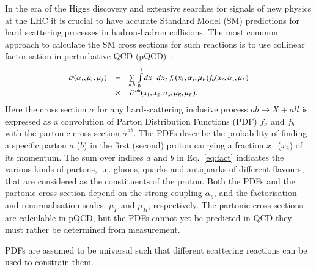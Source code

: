 In the era of the Higgs discovery and extensive searches
for signals of new physics at the LHC it is crucial
to have accurate Standard Model (SM) predictions for
hard scattering processes in hadron-hadron collisions.
The most common approach to calculate the SM cross sections for  
such reactions is to use collinear factorisation in perturbative QCD (pQCD)~\cite{Collins:1989}:
\begin{equation}
\small
\begin{array}{lcl}
\sigma(\alpha_s,\mu_r,\mu_f) & = &
\sum\limits_{a,b}\,  \int\limits_{0}\limits^{1} dx_1\ dx_2\, f_a(x_1,\alpha_s,\mu_F) 
 f_b(x_2,\alpha_s,\mu_F)\\ 
& \times & \, \hat{\sigma}^{ab}(x_1,x_2;\alpha_s,\mu_R,\mu_F).
\label{eq:fact}
\end{array}
\end{equation}
Here the cross section $\sigma$ for 
any hard-scattering inclusive process $ab \rightarrow X + all$
is expressed
as a convolution of Parton Distribution Functions (PDF) $f_a$ and $f_b$
with the partonic cross section
$\hat{\sigma}^{ab}$.
%
The PDFs describe 
the probability of finding a specific parton $a$ ($b$) in the first (second) proton carrying a fraction $x_1$ ($x_2$) of its momentum.
%
The sum over indices $a$ and $b$ in Eq.~\ref{eq:fact} indicates the various 
kinds of partons,
i.e. gluons, quarks and antiquarks of different flavours, 
that are considered
as the constituents of the proton.
%
Both the PDFs and the partonic cross section depend on the strong coupling
$\alpha_s$, and the factorisation and renormalisation scales,
$\mu_F$ and $\mu_R$, respectively.
%
The partonic cross sections are calculable in pQCD, but
the PDFs cannot yet be predicted in QCD 
they must rather be 
determined from measurement. 

PDFs are assumed 
to be universal such that different scattering reactions can be used 
to constrain them.
%

